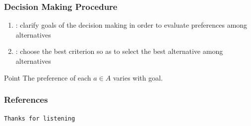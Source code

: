 \documentclass[aspectratio=169, 10pt, fleqn, hyperref={pdfpagelabels=false, bookmarks=false, hyperfootnotes=false}]{beamer}
\begin{document}
\begin{frame}[label=dmprocedure]
  \frametitle{Decision Making Procedure}
  \begin{enumerate}
    \item {}: clarify goals of the decision making in order to
      evaluate preferences among alternatives
    \item {}: choose the best criterion so as to select
      the best alternative among alternatives
  \end{enumerate}
  \begin{alertblock}{Point}
    The preference of each $a \in A$ varies with goal.
  \end{alertblock}
\end{frame}

\begin{frame}[label=bib]%
  \frametitle{References}
  \beamertemplatetextbibitems
      {\tiny
        
        
      }
\end{frame}

\begin{frame}
  \vspace*{\dimexpr\aauheaderheight+20pt\relax}
  \vfill
  \begin{center}
    {\tt Thanks for listening\exclaim}
  \end{center}
  \vfill
\end{frame}

\end{document}
